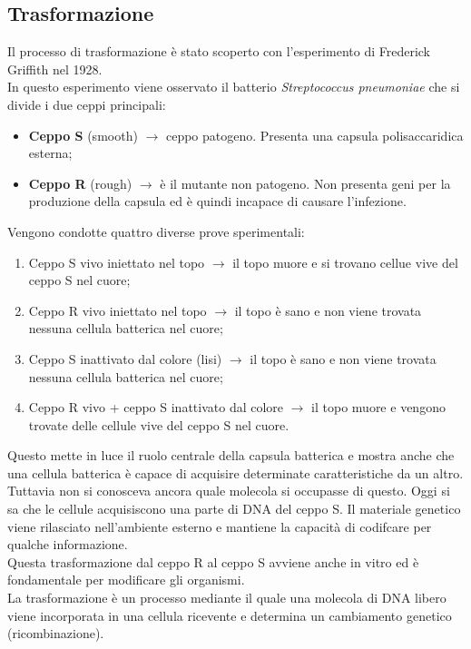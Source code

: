 \subsection{Trasformazione} 
Il processo di trasformazione è stato scoperto con l'esperimento di Frederick Griffith nel 1928. 
\\In questo esperimento viene osservato il batterio \textit{Streptococcus pneumoniae} che si divide i due ceppi principali:
\begin{itemize}
    \item \textbf{Ceppo S} (smooth) $\xrightarrow{}$ ceppo patogeno. Presenta una capsula polisaccaridica esterna;
    \item \textbf{Ceppo R} (rough) $\xrightarrow{}$ è il mutante non patogeno. Non presenta geni per la produzione della capsula ed è quindi incapace di causare l'infezione.
\end{itemize}
Vengono condotte quattro diverse prove sperimentali:
\begin{enumerate}
    \item Ceppo S vivo iniettato nel topo $\xrightarrow{}$ il topo muore e si trovano cellue vive del ceppo S nel cuore; 
    \item Ceppo R vivo iniettato nel topo $\xrightarrow{}$ il topo è sano e non viene trovata nessuna cellula batterica nel cuore;
    \item Ceppo S inattivato dal colore (lisi) $\xrightarrow{}$ il topo è sano e non viene trovata nessuna cellula batterica nel cuore; 
    \item Ceppo R vivo + ceppo S inattivato dal colore $\xrightarrow{}$ il topo muore e vengono trovate delle cellule vive del ceppo S nel cuore.
\end{enumerate}
Questo mette in luce il ruolo centrale della capsula batterica e mostra anche che una cellula batterica è capace di acquisire determinate caratteristiche da un altro. Tuttavia non si conosceva ancora quale molecola si occupasse di questo. Oggi si sa che le cellule acquisiscono una parte di DNA del ceppo S. Il materiale genetico viene rilasciato nell'ambiente esterno e mantiene la capacità di codifcare per qualche informazione. 
\\Questa trasformazione dal ceppo R al ceppo S avviene anche in vitro ed è fondamentale per modificare gli organismi.
\\La trasformazione è un processo mediante il quale una molecola di DNA libero viene incorporata in una cellula ricevente e determina un cambiamento genetico (ricombinazione). 
